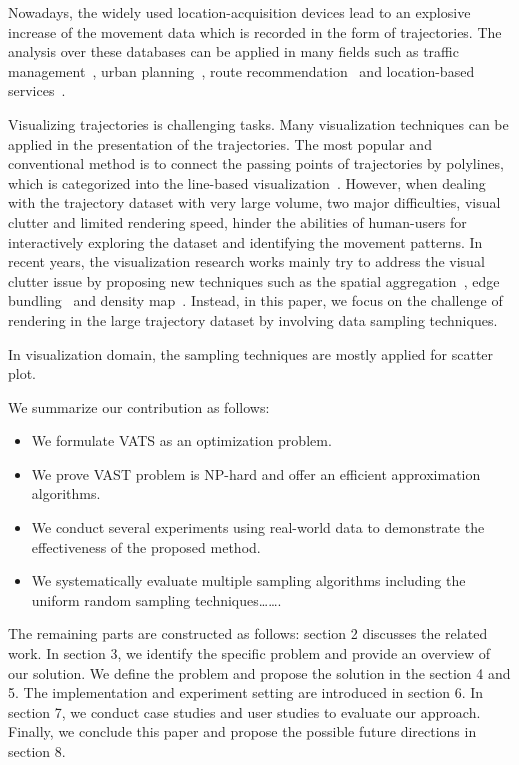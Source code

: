 Nowadays, the widely used location-acquisition devices lead to an explosive increase of the movement data which is recorded in the form of trajectories. 
The analysis over these databases can be applied in many fields such as traffic management~\cite{wang2014visual}, urban planning~\cite{}, route recommendation~\cite{} and location-based services~\cite{liu2016smartadp}. 

Visualizing trajectories is challenging tasks. Many visualization techniques can be applied in the presentation of the trajectories. The most popular and conventional method is to connect the passing points of trajectories by polylines, which is categorized into the line-based visualization~\cite{chen2015survey}.
However, when dealing with the trajectory dataset with very large volume, two major difficulties, visual clutter and limited rendering speed, hinder the abilities of human-users for interactively exploring the dataset and identifying the movement patterns. 
In recent years, the visualization research works mainly try to address the visual clutter issue by proposing new techniques such as the spatial aggregation~\cite{}, edge bundling~\cite{} and density map~\cite{}. Instead, in this paper, we focus on the challenge of rendering in the large trajectory dataset by involving data sampling techniques. 


In visualization domain, the sampling techniques are mostly applied for scatter plot.  




We summarize our contribution as follows:
\begin{itemize}[noitemsep]
  \item We formulate VATS as an optimization problem.
  \item We prove VAST problem is NP-hard and offer an efficient approximation algorithms. 
  \item We conduct several experiments using real-world data to demonstrate the effectiveness of the proposed method.
  \item We systematically evaluate multiple sampling algorithms including the uniform random sampling techniques…….
\end{itemize}


The remaining parts are constructed as follows: section 2 discusses the related work. In section 3, we identify the specific problem and provide an overview of our solution. We define the problem and propose the solution in the section 4 and 5. The implementation and experiment setting are introduced in section 6. 
In section 7, we conduct case studies and user studies to evaluate our approach. Finally, we conclude this paper and propose the possible future directions in section 8.
